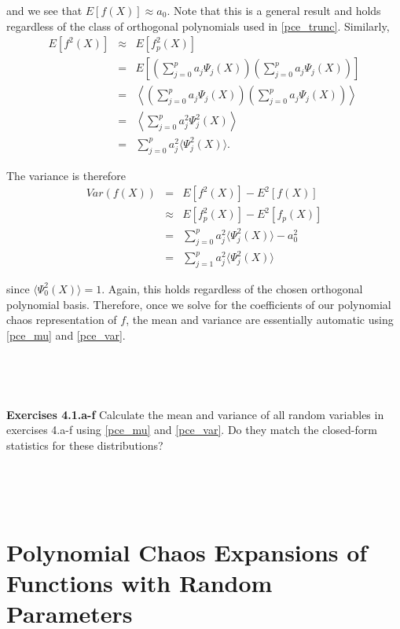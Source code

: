 \documentclass[11pt]{article}
\numberwithin{equation}{section}
\begin{document}
and we see that $E[ f(X) ] \approx a_0$. Note that this is a general result and holds regardless of the class of orthogonal polynomials used in \eqref{pce_trunc}. Similarly,
\begin{eqnarray*}
E [ f^2(X) ] & \approx & E [ f_p^2(X) ] \\
& = & E \left[ \left( \sum_{j = 0}^p a_j \Psi_j(X) \right) \left( \sum_{j = 0}^p a_j \Psi_j(X) \right) \right] \\
& = & \left\langle \left( \sum_{j = 0}^p a_j \Psi_j(X) \right) \left( \sum_{j = 0}^p a_j \Psi_j(X) \right) \right\rangle \\
& = & \left\langle \sum_{j = 0}^p a_j^2 \Psi_j^2(X) \right\rangle \\
& = & \sum_{j = 0}^p a_j^2  \langle \Psi_j^2(X) \rangle.
\end{eqnarray*}

The variance is therefore
\begin{eqnarray}
Var(f(X)) & = & E \left[ f^2(X) \right] - E^2 \left[ f(X) \right] \nonumber \\
& \approx & E \left[ f_p^2(X) \right] - E^2 \left[ f_p(X) \right] \nonumber \\
& = & \sum_{j = 0}^p a_j^2  \langle \Psi_j^2(X) \rangle - a_0^2  \nonumber \\
& = & \sum_{j = 1}^p a_j^2  \langle \Psi_j^2(X) \rangle \label{pce_var}
\end{eqnarray}

since $\langle \Psi_0^2(X) \rangle = 1$. Again, this holds regardless of the chosen orthogonal polynomial basis. Therefore, once we solve for the coefficients of our polynomial chaos representation of $f$, the mean and variance are essentially automatic using \eqref{pce_mu} and \eqref{pce_var}.

\

\

\textbf{Exercises 4.1.a-f} Calculate the mean and variance of all random variables in exercises 4.a-f using \eqref{pce_mu} and \eqref{pce_var}. Do they match the closed-form statistics for these distributions?

\

\










\section{Polynomial Chaos Expansions of Functions with Random Parameters}
\end{document}
